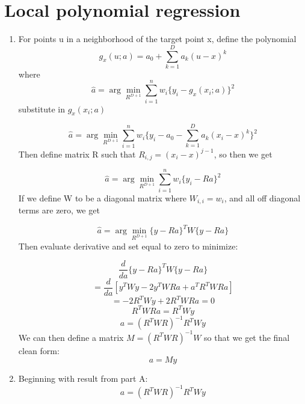 \documentclass[10pt]{article}
\begin{document}
    \section*{Local polynomial regression}
        \begin{enumerate}[label=(\Alph*)]
        \item

        For points u in a neighborhood of the target point x, define the polynomial
        $$g_x(u;a) = a_0 + \sum_{k=1}^Da_k(u-x)^k$$
        where 
        $$\hat{a} = \arg \min_{R^{D+1}}  \sum_{i=1}^{n}w_i\{y_i-g_x(x_i;a)\}^2$$
        substitute in $g_x(x_i;a)$

        $$\hat{a} = \arg \min_{R^{D+1}}  \sum_{i=1}^{n}w_i\{y_i-a_0 - \sum_{k=1}^Da_k(x_i-x)^k\}^2$$
        Then define matrix R such that $R_{i,j} = (x_i-x)^{j-1}$, so then we get 

        $$\hat{a} = \arg \min_{R^{D+1}}  \sum_{i=1}^{n}w_i\{y_i-Ra\}^2$$
        If we define W to be a diagonal matrix where $W_{i,i}=w_i$, and all off diagonal terms are zero, we get

        $$\hat{a} = \arg \min_{R^{D+1}}  \{y-Ra\}^TW\{y-Ra\}$$
        Then evaluate derivative and set equal to zero to minimize:

        $$\frac{d}{da}\{y-Ra\}^TW\{y-Ra\}$$
        $$=\frac{d}{da}[y^TWy-2y^TWRa+a^TR^TWRa]$$
        $$=-2R^TWy+2R^TWRa = 0$$
        $$R^TWRa=R^TWy$$
        $$a = (R^TWR)^{-1}R^TWy$$
        We can then define a matrix $M=(R^TWR)^{-1}W$ so that we get the final clean form:
        $$a=My$$
        \item
        Beginning with result from part A:
        $$a = (R^TWR)^{-1}R^TWy$$



\end{enumerate}
\end{document}
